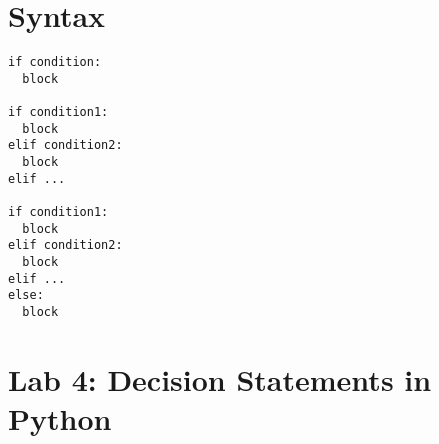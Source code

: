 \documentclass[11pt, letterpaper]{article}
\begin{document}


%
%
%
%
%

\section*{Syntax}

\begin{lstlisting}
if condition:
  block

if condition1:
  block
elif condition2:
  block
elif ...

if condition1:
  block
elif condition2:
  block
elif ...
else:
  block
\end{lstlisting}




\section*{Lab 4: Decision Statements in Python}
\end{document}
